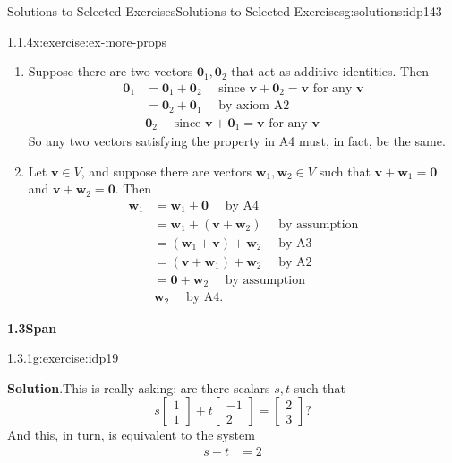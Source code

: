 \documentclass[oneside,10pt,]{book}
\newcommand{\blocktitlefont}{\relax}
\numberwithin{equation}{section}
\newcommand{\bbm}{\begin{bmatrix}}
\newcommand{\ebm}{\end{bmatrix}}
\newcommand{\vv}{\mathbf{v}}
\newcommand{\ww}{\mathbf{w}}
\newcommand{\zer}{\mathbf{0}}
\newcommand{\amp}{&}
\begin{document}
\begin{solutions-chapter}{Solutions to Selected Exercises}{}{Solutions to Selected Exercises}{}{}{g:solutions:idp143}
\begin{inlinesolution}{1.1.4}{}{x:exercise:ex-more-props}
\begin{enumerate}
\begin{equation*}
\frac1c(c\vv)=\bigl(\frac1c\cdot c\bigr)\vv = 1\vv = \vv\text{,}
\end{equation*}
showing that \(\vv=\zer\), and thus \(c=0\) or \(\vv=\zer\). (This is a proof by cases, relying on the tautology \(c=0\) or \(c\neq 0\).)%
\item{}Suppose there are two vectors \(\zer_1,\zer_2\) that act as additive identities. Then%
\begin{align*}
\zer_1 \amp = \zer_1+\zer_2 \quad \text{ since } \vv+\zer_2=\vv \text{ for any } \vv\\
\amp =\zer_2+\zer_1 \quad \text{ by axiom A2}\\
\amp \zer_2 \quad \text{ since } \vv+\zer_1=\vv \text{ for any } \vv
\end{align*}
So any two vectors satisfying the property in A4 must, in fact, be the same.%
\item{}Let \(\vv\in V\), and suppose there are vectors \(\ww_1,\ww_2\in V\) such that \(\vv+\ww_1=\zer\) and \(\vv+\ww_2=\zer\). Then%
\begin{align*}
\ww_1 \amp = \ww_1+\zer \quad  \text{ by A4}\\
\amp = \ww_1+(\vv+\ww_2) \quad \text{ by assumption}\\
\amp = (\ww_1+\vv)+\ww_2 \quad \text{ by A3}\\
\amp = (\vv+\ww_1)+\ww_2 \quad \text{ by A2}\\
\amp = \zer+\ww_2 \quad \text{ by assumption}\\
\amp \ww_2 \quad \text{ by A4}\text{.}
\end{align*}
%
\end{enumerate}
%
\end{inlinesolution}%
\par\medskip
\noindent\textbf{\Large{}1.3\space\textperiodcentered\space{}Span}
\begin{inlinesolution}{1.3.1}{}{g:exercise:idp19}%
\par\smallskip%
\noindent\textbf{\blocktitlefont Solution}.\hypertarget{g:solution:idp145-back}{}\quad{}This is really asking: are there scalars \(s,t\) such that%
\begin{equation*}
s\bbm 1\\1\ebm + t\bbm -1\\2\ebm = \bbm 2\\3\ebm\text{?}
\end{equation*}
And this, in turn, is equivalent to the system%
\begin{align*}
s -t \amp=2 \\

\end{align*}
\end{inlinesolution}
\end{solutions-chapter}
\end{document}
